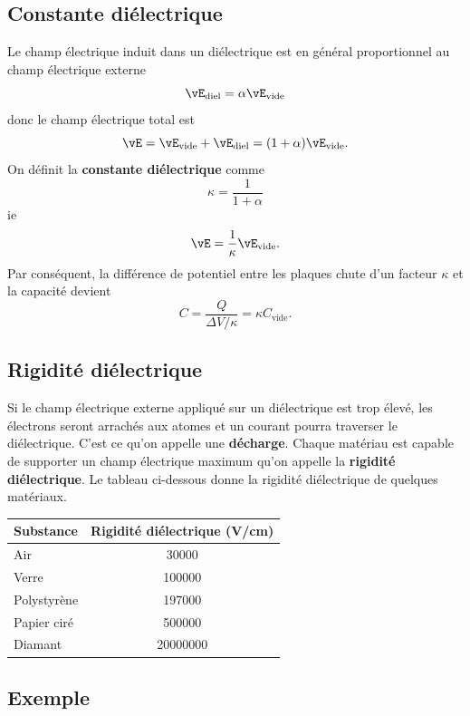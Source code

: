 \subsection*{Constante diélectrique}


Le champ électrique induit dans un diélectrique est en général proportionnel au
champ électrique externe
$$\vE_\text{diel} = \alpha \vE_\text{vide}$$
donc le champ électrique total est
$$\vE = \vE_\text{vide} + \vE_\text{diel} = (1 + \alpha) \vE_\text{vide}.$$
On définit la \textbf{constante diélectrique} comme
$$\kappa = \frac{1}{1 + \alpha}$$
ie
$$\vE = \frac{1}{\kappa} \vE_\text{vide}.$$
Par conséquent, la différence de potentiel entre les plaques chute d'un facteur
$\kappa$ et la capacité devient
$$C = \frac{Q}{\Delta V / \kappa} = \kappa C_\text{vide}.$$


\subsection*{Rigidité diélectrique}

Si le champ électrique externe appliqué sur un diélectrique est trop élevé, les
électrons seront arrachés aux atomes et un courant pourra traverser le
diélectrique. C'est ce qu'on appelle une \textbf{décharge}. Chaque matériau est
capable de supporter un champ électrique maximum qu'on appelle la
\textbf{rigidité diélectrique}. Le tableau ci-dessous donne la rigidité
diélectrique de quelques matériaux.

\begin{center}
\begin{tabular}{lS}
  \toprule
  Substance       &        {Rigidité diélectrique (\si{V/cm})}     \\
  \midrule
  Air             &  30000  \\
  Verre           &  100000 \\
  Polystyrène     &  197000 \\
  Papier ciré     &  500000 \\
  Diamant         &  20000000 \\
  \bottomrule
\end{tabular}
\end{center}


\subsection*{Exemple}

